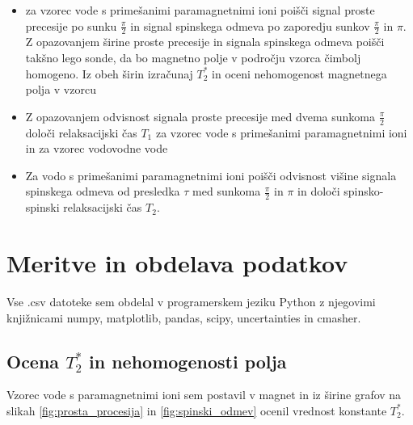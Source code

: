 \documentclass[11pt]{article}
\begin{document}
\begin{itemize}
\item za vzorec vode s primešanimi paramagnetnimi ioni poišči signal proste precesije po sunku \(\frac{\pi}{2}\) in signal spinskega odmeva po zaporedju sunkov \(\frac{\pi}{2}\) in \(\pi\). Z opazovanjem širine proste precesije in signala spinskega odmeva poišči takšno lego sonde, da bo magnetno polje v področju vzorca čimbolj homogeno. Iz obeh širin izračunaj \(T_2^{*}\) in oceni nehomogenost magnetnega polja v vzorcu
\item Z opazovanjem odvisnost signala proste precesije med dvema sunkoma \(\frac{\pi}{2}\) določi relaksacijski čas \(T_1\) za vzorec vode s primešanimi paramagnetnimi ioni in za vzorec vodovodne vode
\item Za vodo s primešanimi paramagnetnimi ioni poišči odvisnost višine signala spinskega odmeva od presledka \(\tau\) med sunkoma \(\frac{\pi}{2}\) in \(\pi\) in določi spinsko-spinski relaksacijski čas \(T_2\).
\end{itemize}

\section{Meritve in obdelava podatkov}\label{sec:org93542d4}
Vse .csv datoteke sem obdelal v programerskem jeziku Python z njegovimi knjižnicami numpy, matplotlib, pandas, scipy, uncertainties in cmasher.
\subsection{Ocena \(T_2^{*}\) in nehomogenosti polja}\label{sec:org135c7a5}
Vzorec vode s paramagnetnimi ioni sem postavil v magnet in iz širine grafov na slikah \ref{fig:prosta_procesija} in \ref{fig:spinski_odmev} ocenil vrednost konstante \(T_2^{*}\).
\end{document}
